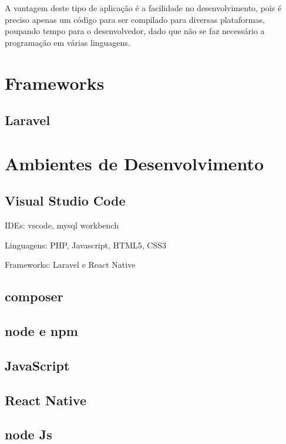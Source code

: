 		A vantagem deste tipo de aplicação é a facilidade no desenvolvimento, pois é preciso apenas um código para ser compilado para diversas plataformas, poupando tempo para o  desenvolvedor, dado que não se faz necessário a programação em várias linguagens.
	
\section{Frameworks}


	\subsection{Laravel}
	
		
	
\section{Ambientes de Desenvolvimento}
	
	\subsection{Visual Studio Code}
	
	IDEs: vscode, mysql workbench
	
	Linguagens: PHP, Javascript, HTML5, CSS3
	
	Frameworks: Laravel e React Native

	\subsection{composer}
	
	\subsection{node e npm}
	
		\subsection{JavaScript}
	
	\subsection{React Native} %
	\subsection{node Js} 
 









